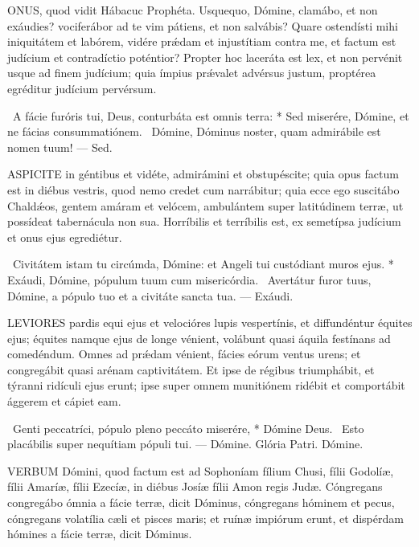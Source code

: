 
\lettrine[lines=2]{O}{NUS}, quod vidit Hábacuc Prophéta. Usquequo, Dómine, clamábo, et non exáudies? vociferábor ad te vim pátiens, et non salvábis? Quare ostendísti mihi iniquitátem et labórem, vidére prǽdam et injustítiam contra me, et factum est judícium et contradíctio poténtior? Propter hoc laceráta est lex, et non pervénit usque ad finem judícium; quia ímpius prǽvalet advérsus justum, proptérea egréditur judícium pervérsum.

\R\ A fácie furóris tui, Deus, conturbáta est omnis terra: * Sed miserére, Dómine, et ne fácias consummatiónem. \V\ Dómine, Dóminus noster, quam admirábile est nomen tuum! — Sed.


\lettrine[lines=2]{A}{SPICITE} in géntibus et vidéte, admirámini et obstupéscite; quia opus factum est in diébus vestris, quod nemo credet cum narrábitur; quia ecce ego suscitábo Chaldǽos, gentem amáram et velócem, ambulántem super latitúdinem terræ, ut possídeat tabernácula non sua. Horríbilis et terríbilis est, ex semetípsa judícium et onus ejus egrediétur.

\R\ Civitátem istam tu circúmda, Dómine: et Angeli tui custódiant muros ejus. * Exáudi, Dómine, pópulum tuum cum misericórdia. \V\ Avertátur furor tuus, Dómine, a pópulo tuo et a civitáte sancta tua. — Exáudi.



\lettrine[lines=2]{L}{EVIORES} pardis equi ejus et velocióres lupis vespertínis, et diffundéntur équites ejus; équites namque ejus de longe vénient, volábunt quasi áquila festínans ad comedéndum. Omnes ad prǽdam vénient, fácies eórum ventus urens; et congregábit quasi arénam captivitátem. Et ipse de régibus triumphábit, et týranni ridículi ejus erunt; ipse super omnem munitiónem ridébit et comportábit ággerem et cápiet eam.

\R\ Genti peccatríci, pópulo pleno peccáto miserére, * Dómine Deus. \V\ Esto placábilis super nequítiam pópuli tui. — Dómine. Glória Patri. Dómine.




\lettrine[lines=2]{V}{ERBUM} Dómini, quod factum est ad Sophoníam fílium Chusi, fílii Godolíæ, fílii Amaríæ, fílii Ezecíæ, in diébus Josíæ fílii Amon regis Judæ. Cóngregans congregábo ómnia a fácie terræ, dicit Dóminus, cóngregans hóminem et pecus, cóngregans volatília cæli et pisces maris; et ruínæ impiórum erunt, et dispérdam hómines a fácie terræ, dicit Dóminus.

